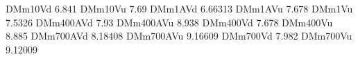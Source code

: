 DMm10Vd 6.841
DMm10Vu 7.69
DMm1AVd 6.66313
DMm1AVu 7.678
DMm1Vu 7.5326
DMm400AVd 7.93
DMm400AVu 8.938
DMm400Vd 7.678
DMm400Vu 8.885
DMm700AVd 8.18408
DMm700AVu 9.16609
DMm700Vd 7.982
DMm700Vu 9.12009
